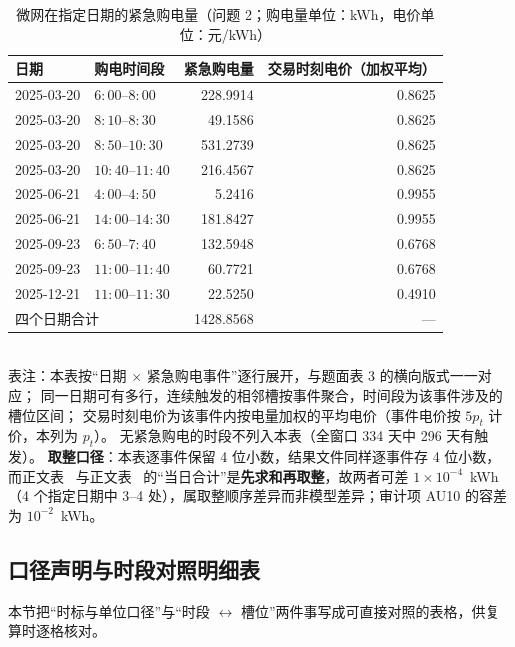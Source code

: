\begin{table}[htbp]
  \centering
  \caption{微网在指定日期的紧急购电量（问题 2；购电量单位：\unit{kWh}，电价单位：\unit{元/kWh}）}
  \label{tab:q2-emergency}
  \footnotesize
  \begin{tabular}{llrr}
    \toprule
    日期 & 购电时间段 & 紧急购电量 & 交易时刻电价（加权平均） \\
    \midrule
    2025-03-20 & \(6{:}00\)--\(8{:}00\)   & 228.9914 & 0.8625 \\
    2025-03-20 & \(8{:}10\)--\(8{:}30\)   & 49.1586  & 0.8625 \\
    2025-03-20 & \(8{:}50\)--\(10{:}30\)  & 531.2739 & 0.8625 \\
    2025-03-20 & \(10{:}40\)--\(11{:}40\) & 216.4567 & 0.8625 \\
    \midrule
    2025-06-21 & \(4{:}00\)--\(4{:}50\)   & 5.2416   & 0.9955 \\
    2025-06-21 & \(14{:}00\)--\(14{:}30\) & 181.8427 & 0.9955 \\
    \midrule
    2025-09-23 & \(6{:}50\)--\(7{:}40\)   & 132.5948 & 0.6768 \\
    2025-09-23 & \(11{:}00\)--\(11{:}40\) & 60.7721  & 0.6768 \\
    \midrule
    2025-12-21 & \(11{:}00\)--\(11{:}30\) & 22.5250 & 0.4910 \\
    \midrule
    \multicolumn{2}{l}{四个日期合计} & 1428.8568 & --- \\
    \bottomrule
  \end{tabular}
  \\[1ex]
  {\footnotesize 表注：本表按“日期 \(\times\) 紧急购电事件”逐行展开，与题面表 3 的横向版式一一对应；
  同一日期可有多行，连续触发的相邻槽按事件聚合，时间段为该事件涉及的槽位区间；
  交易时刻电价为该事件内按电量加权的平均电价（事件电价按 \(5p_t\) 计价，本列为 \(p_t\)）。
  无紧急购电的时段不列入本表（全窗口 334 天中 296 天有触发）。
  \textbf{取整口径}：本表逐事件保留 4 位小数，结果文件同样逐事件存 4 位小数，而正文表~
  与正文表~ 的“当日合计”是\textbf{先求和再取整}，故两者可差 \(1\times10^{-4}\)~kWh
  （4 个指定日期中 3--4 处），属取整顺序差异而非模型差异；审计项 AU10 的容差为 \(10^{-2}\)~kWh。}
\end{table}

\subsection{口径声明与时段对照明细表}

本节把“时标与单位口径”与“时段 \(\leftrightarrow\) 槽位”两件事写成可直接对照的表格，供复算时逐格核对。

